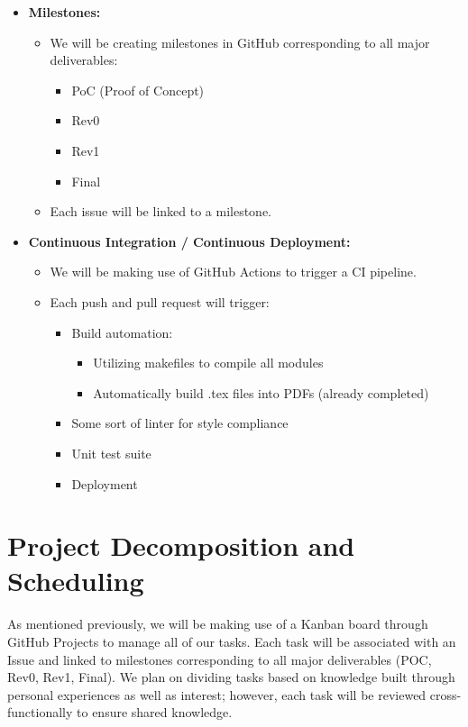 \documentclass{article}
\begin{document}
\begin{itemize}
    \item \textbf{Milestones:}
    \begin{itemize}
        \item We will be creating milestones in GitHub corresponding to all major deliverables:
        \begin{itemize}
            \item PoC (Proof of Concept)
            \item Rev0
            \item Rev1
            \item Final
        \end{itemize}
        \item Each issue will be linked to a milestone.
    \end{itemize}

    \item \textbf{Continuous Integration / Continuous Deployment:}
    \begin{itemize}
        \item We will be making use of GitHub Actions to trigger a CI pipeline.
        \item Each push and pull request will trigger:
        \begin{itemize}
            \item Build automation:
            \begin{itemize}
                \item Utilizing makefiles to compile all modules
                \item Automatically build .tex files into PDFs (already completed)
            \end{itemize}
            \item Some sort of linter for style compliance
            \item Unit test suite
            \item Deployment
        \end{itemize}
    \end{itemize}
\end{itemize}

\section{Project Decomposition and Scheduling}


As mentioned previously, we will be making use of a Kanban board through GitHub Projects to manage all of our tasks. Each task will be associated with an Issue and linked to milestones corresponding to all major deliverables (POC, Rev0, Rev1, Final). We plan on dividing tasks based on knowledge built through personal experiences as well as interest; however, each task will be reviewed cross-functionally to ensure shared knowledge.
\end{document}
